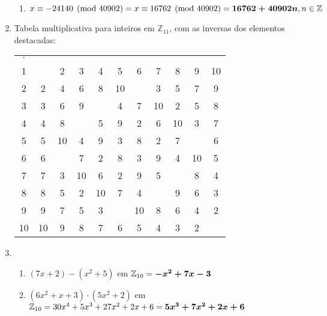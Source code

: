 \documentclass[fleqn]{article}
\begin{document}
\begin{enumerate}[label=\textbf{\arabic*})]
\begin{enumerate}
\item $x \equiv -24140 \pmod{40902} \\
= x \equiv 16762 \pmod{40902} \\
= \boldsymbol{16762 + 40902n}, n \in \mathbb{Z}$

\end{enumerate}

\item Tabela multiplicativa para inteiros em $\mathbb{Z}_{11}$, com as
inversas dos elementos destacadas:

\begin{tabular}{>{\color[gray]{0.35}}c *{10}{>{\color[gray]{0.8}}c}}
$\cdot$ & \color[gray]{0.35}{1} & \color[gray]{0.35}{2} &
\color[gray]{0.35}{3} & \color[gray]{0.35}{4} & \color[gray]{0.35}{5} &
\color[gray]{0.35}{6} & \color[gray]{0.35}{7} & \color[gray]{0.35}{8} &
\color[gray]{0.35}{9} & \color[gray]{0.35}{10} \\
1  & \color{black}{1} & 2 & 3 & 4 & 5 & 6 & 7 & 8 & 9 & 10 \\
2  & 2 & 4 & 6 & 8 & 10 & \color{black}{1} & 3 & 5 & 7 & 9 \\
3  & 3 & 6 & 9 & \color{black}{1} & 4 & 7 & 10 & 2 & 5 & 8 \\
4  & 4 & 8 & \color{black}{1} & 5 & 9 & 2 & 6 & 10 & 3 & 7 \\
5  & 5 & 10 & 4 & 9 & 3 & 8 & 2 & 7 & \color{black}{1} & 6 \\
6  & 6 & \color{black}{1} & 7 & 2 & 8 & 3 & 9 & 4 & 10 & 5 \\
7  & 7 & 3 & 10 & 6 & 2 & 9 & 5 & \color{black}{1} & 8 & 4 \\
8  & 8 & 5 & 2 & 10 & 7 & 4 & \color{black}{1} & 9 & 6 & 3 \\
9  & 9 & 7 & 5 & 3 & \color{black}{1} & 10 & 8 & 6 & 4 & 2 \\
10 & 10 & 9 & 8 & 7 & 6 & 5 & 4 & 3 & 2 & \color{black}{1} \\
\end{tabular}

\item

\begin{enumerate}

\item $(7x + 2) - (x^2 + 5)$ em $\mathbb{Z}_{10} \\
= \boldsymbol{-x^2 + 7x - 3}$

\item $(6x^2 + x + 3) \cdot (5x^2 + 2)$ em $\mathbb{Z}_{10} \\
= 30x^4 + 5x^3 + 27x^2 + 2x + 6 \\
= \boldsymbol{5x^3 + 7x^2 + 2x + 6}$


\end{enumerate}
\end{enumerate}
\end{document}
